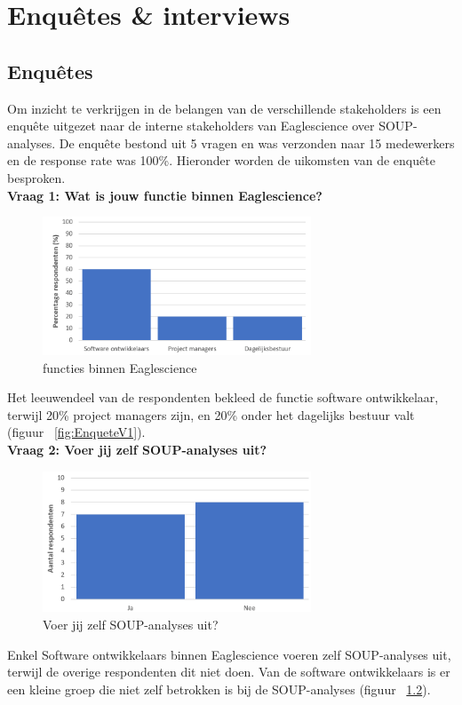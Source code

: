 
\chapter{Enquêtes \& interviews}\label{ch:Enquetes-interviews}
\section{Enquêtes}\label{sec:enquetes}

Om inzicht te verkrijgen in de belangen van de verschillende stakeholders is een enquête uitgezet naar de interne stakeholders van Eaglescience over SOUP-analyses. De enquête bestond uit 5 vragen en was verzonden naar 15 medewerkers en de response rate was 100\%. Hieronder worden de uikomsten van de enquête besproken.\\

\textbf{Vraag 1: Wat is jouw functie binnen Eaglescience?}\\
\begin{figure}[bth]
    \centering
    \includegraphics[width=8cm]{gfx/appendix/Vraag1}
    \caption{functies binnen Eaglescience}
    \label{fig:enqueteV1}
\end{figure}

Het leeuwendeel van de respondenten bekleed de functie software ontwikkelaar, terwijl 20\% project managers zijn, en 20\% onder het dagelijks bestuur valt (figuur ~\ref{fig:EnqueteV1}).\\

\textbf{Vraag 2: Voer jij zelf SOUP-analyses uit?}\\
\begin{figure}[bth]
    \centering
    \includegraphics[width=8cm]{gfx/appendix/Vraag2}
    \caption{Voer jij zelf SOUP-analyses uit?}
    \label{fig:EnqueteV2}
\end{figure}
Enkel Software ontwikkelaars binnen Eaglescience voeren zelf SOUP-analyses uit, terwijl de overige respondenten dit niet doen. Van de software ontwikkelaars is er een kleine groep die niet zelf betrokken is bij de SOUP-analyses (figuur ~\ref{fig:EnqueteV2}).\\

